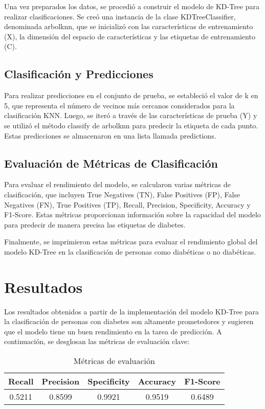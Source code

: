 \documentclass[]{article}
\begin{document}
Una vez preparados los datos, se procedió a construir el modelo de KD-Tree para realizar clasificaciones. Se creó una instancia de la clase KDTreeClassifier, denominada arbolknn, que se inicializó con las características de entrenamiento (X), la dimensión del espacio de características y las etiquetas de entrenamiento (C).

\subsection{Clasificación y Predicciones}

Para realizar predicciones en el conjunto de prueba, se estableció el valor de k en 5, que representa el número de vecinos más cercanos considerados para la clasificación KNN. Luego, se iteró a través de las características de prueba (Y) y se utilizó el método classify de arbolknn para predecir la etiqueta de cada punto. Estas predicciones se almacenaron en una lista llamada predictions.

\subsection{Evaluación de Métricas de Clasificación}

Para evaluar el rendimiento del modelo, se calcularon varias métricas de clasificación, que incluyen True Negatives (TN), False Positives (FP), False Negatives (FN), True Positives (TP), Recall, Precision, Specificity, Accuracy y F1-Score. Estas métricas proporcionan información sobre la capacidad del modelo para predecir de manera precisa las etiquetas de diabetes.

Finalmente, se imprimieron estas métricas para evaluar el rendimiento global del modelo KD-Tree en la clasificación de personas como diabéticas o no diabéticas.

\section{Resultados}
Los resultados obtenidos a partir de la implementación del modelo KD-Tree para la clasificación de personas con diabetes son altamente prometedores y sugieren que el modelo tiene un buen rendimiento en la tarea de predicción. A continuación, se desglosan las métricas de evaluación clave:
\begin{table}[ht]
	\centering
	\caption{Métricas de evaluación}
	\begin{tabular}{|c|c|c|c|c|}
		\hline
		\textbf{Recall} & \textbf{Precision} & \textbf{Specificity} & \textbf{Accuracy} & \textbf{F1-Score} \\
		\hline
		0.5211 & 0.8599 & 0.9921 &  0.9519 & 0.6489 \\
		\hline

	\end{tabular}

\end{table}
\end{document}
